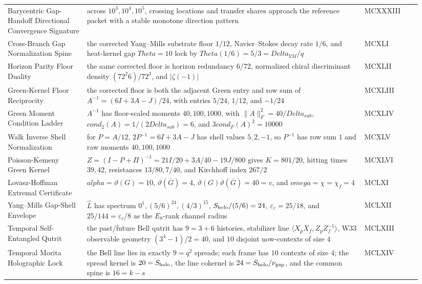 \documentclass[11pt]{article}
\def\mathrm#1{#1}%
\def\omega{omega}%
\def\alpha{alpha}%
\def\Delta{Delta}%
\def\Theta{Theta}%
\def\cdot{ }%
\begin{document}
{\begin{longtable}{>{\raggedright\arraybackslash}p{0.18\linewidth} >{\raggedright\arraybackslash}p{0.63\linewidth} >{\raggedright\arraybackslash}p{0.13\linewidth}}
Barycentric Gap-Handoff Directional Convergence Signature & across $10^3,10^4,10^5$, crossing locations and transfer shares approach the reference packet with a stable monotone direction pattern & MCXXXIII \\
Cross-Branch Gap Normalization Spine & the corrected Yang--Mills substrate floor $1/12$, Navier--Stokes decay rate $1/6$, and heat-kernel gap $\Theta=10$ lock by $\Theta\cdot(1/6)=5/3=\Delta_{YM}/q$ & MCXLI \\
Horizon Parity Floor Duality & the same corrected floor is horizon redundancy $6/72$, normalized chiral discriminant density $(72^2\cdot6)/72^3$, and $|\zeta(-1)|$ & MCXLII \\
Green-Kernel Floor Reciprocity & the corrected floor is both the adjacent Green entry and row sum of $A^{-1}=(6I+3A-J)/24$, with entries $5/24$, $1/12$, and $-1/24$ & MCXLIII \\
Green Moment Condition Ladder & $A^{-1}$ has floor-scaled moments $40,100,1000$, with $\|A\|_F^2=40/\Delta_{sub}$, $\mathrm{cond}_2(A)=1/(2\Delta_{sub})=6$, and $3\mathrm{cond}_F(A)^2=10000$ & MCXLIV \\
Walk Inverse Shell Normalization & for $P=A/12$, $2P^{-1}=6I+3A-J$ has shell values $5,2,-1$, so $P^{-1}$ has row sum $1$ and raw moments $40,100,1000$ & MCXLV \\
Poisson-Kemeny Green Kernel & $Z=(I-P+\Pi)^{-1}=21I/20+3A/40-19J/800$ gives $K=801/20$, hitting times $39,42$, resistances $13/80,7/40$, and Kirchhoff index $267/2$ & MCXLVI \\
Lovasz-Hoffman Extremal Certificate & $\alpha=\vartheta(G)=10$, $\vartheta(\overline G)=4$, $\vartheta(G)\vartheta(\overline G)=40=v$, and $\omega=\chi=\chi_f=4$ & MCLXI \\
Yang--Mills Gap-Shell Envelope & $\widehat L$ has spectrum $0^1,(5/6)^{24},(4/3)^{15}$, $S_{\rm holo}/(5/6)=24$, $\varepsilon_c=25/18$, and $25/144=\varepsilon_c/8$ as the $E_8$-rank channel radius & MCLXII \\
Temporal Self-Entangled Qutrit & the past/future Bell qutrit has $9=3+6$ histories, stabilizer line $\langle X_pX_f,Z_pZ_f^{-1}\rangle$, W33 observable geometry $(3^4-1)/2=40$, and $10$ disjoint now-contexts of size $4$ & MCLXIII \\
Temporal Morita Holographic Lock & the Bell line lies in exactly $9=q^2$ spreads; each frame has $10$ contexts of size $4$; the spread kernel is $20=S_{\rm holo}$, the line cokernel is $24=S_{\rm holo}/\nu_{\rm gap}$, and the common spine is $16=k-s$ & MCLXIV \\

\end{longtable}}
\end{document}
